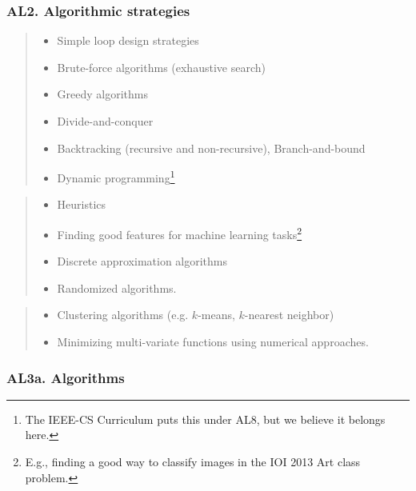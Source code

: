 \documentclass[a4paper,11pt,oneside]{article}
\newcommand{\cmark}{\ding{51}}%
\newcommand{\xmark}{\ding{55}}%
\newcommand{\CC}[1]{#1}
\newcommand{\ccode}{{\small\cmark\faFileText}}
\newcommand{\cnfoc}{{\small\faQuestion}}
\newcommand{\cexcl}{{\small\xmark}}
\newcommand{\Icodeonly}{\item[\hbox to 1.8em{\ccode\hfill}]}
\newcommand{\Inofocus}{\item[\hbox to 1.8em{\cnfoc\hfill}]}
\newcommand{\Iexcluded}{\item[\hbox to 1.8em{\cexcl\hfill}]}
\newenvironment{myitemize}{\begin{quote}\begin{itemize}\itemsep 0pt}{\end{itemize}\end{quote}}
\begin{document}
    \subsubsection*{AL2. Algorithmic strategies}%

    \begin{myitemize}
    \Icodeonly Simple loop design strategies
    \Icodeonly\CC{Brute-force algorithms} (exhaustive search)
    \Icodeonly\CC{Greedy algorithms}
    \Icodeonly\CC{Divide-and-conquer}
    \Icodeonly\CC{Backtracking} (recursive and non-recursive), \CC{Branch-and-bound}
    \Icodeonly\CC{Dynamic programming}\footnote{The IEEE-CS Curriculum puts this under AL8, but we believe it belongs here.} 
    \end{myitemize}
  
    \begin{myitemize}
    \Inofocus Heuristics
    \Inofocus Finding good features for machine learning tasks\footnote{E.g., finding a good way to classify images in the IOI 2013 Art class problem.}
    \Inofocus Discrete approximation algorithms
    \Inofocus Randomized algorithms.
    \end{myitemize}
  
    \begin{myitemize}
    \Iexcluded Clustering algorithms (e.g. $k$-means, $k$-nearest neighbor)
    \Iexcluded Minimizing multi-variate functions using numerical approaches.
    \end{myitemize}
  
    \subsubsection*{AL3a. Algorithms}%
\end{document}
